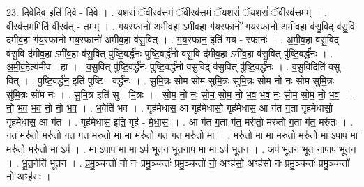 \documentclass[17pt]{extarticle}
\begin{document}
23. दि॒वेदि॑व॒ इति॑ दि॒वे - दि॒वे॒ । . य॒शसं॑ ॅवी॒रव॑त्तमं ॅवी॒रव॑त्तमं ॅय॒शसं॑ ॅय॒शसं॑ ॅवी॒रव॑त्तमम् । . वी॒रव॑त्तम॒मिति॑ वी॒रव॑त् - त॒म॒म् । . ग॒य॒स्फानो॑ अमीव॒हा ऽमी॑व॒हा ग॑य॒स्फानो॑ गय॒स्फानो॑ अमीव॒हा व॑सु॒विद् व॑सु॒वि द॑मीव॒हा ग॑य॒स्फानो॑ गय॒स्फानो॑ अमीव॒हा व॑सु॒वित् । . ग॒य॒स्फान॒ इति॑ गय - स्फानः॑ । . अ॒मी॒व॒हा व॑सु॒विद् व॑सु॒वि द॑मीव॒हा ऽमी॑व॒हा व॑सु॒वित् पु॑ष्टि॒वर्द्ध॑नः पुष्टि॒वर्द्ध॑नो वसु॒वि द॑मीव॒हा ऽमी॑व॒हा व॑सु॒वित् पु॑ष्टि॒वर्द्ध॑नः । . अ॒मी॒व॒हेत्य॑मीव - हा । . व॒सु॒वित् पु॑ष्टि॒वर्द्ध॑नः पुष्टि॒वर्द्ध॑नो वसु॒विद् व॑सु॒वित् पु॑ष्टि॒वर्द्ध॑नः । . व॒सु॒विदिति॑ वसु - वित् । . पु॒ष्टि॒वर्द्ध॑न॒ इति॑ पुष्टि - वर्द्ध॑नः । . सु॒मि॒त्रः सो॑म सोम सुमि॒त्रः सु॑मि॒त्रः सो॑म नो नः सोम सुमि॒त्रः सु॑मि॒त्रः सो॑म नः । . सु॒मि॒त्र इति॑ सु - मि॒त्रः । . सो॒म॒ नो॒ नः॒ सो॒म॒ सो॒म॒ नो॒ भ॒व॒ भ॒व॒ नः॒ सो॒म॒ सो॒म॒ नो॒ भ॒व॒ । . नो॒ भ॒व॒ भ॒व॒ नो॒ नो॒ भ॒व॒ । . भ॒वेति॑ भव । . गृह॑मेधास॒ आ गृह॑मेधासो॒ गृह॑मेधास॒ आ ग॑त ग॒ता गृह॑मेधासो॒ गृह॑मेधास॒ आ ग॑त । . गृह॑मेधास॒ इति॒ गृह॑ - मे॒धा॒सः॒ । . आ ग॑त ग॒ता ग॑त॒ मरु॑तो॒ मरु॑तो ग॒ता ग॑त॒ मरु॑तः । . ग॒त॒ मरु॑तो॒ मरु॑तो गत गत॒ मरु॑तो॒ मा मा मरु॑तो गत गत॒ मरु॑तो॒ मा । . मरु॑तो॒ मा मा मरु॑तो॒ मरु॑तो॒ मा ऽपाप॒ मा मरु॑तो॒ मरु॑तो॒ मा ऽप॑ । . मा ऽपाप॒ मा मा ऽप॑ भूतन भूत॒नाप॒ मा मा ऽप॑ भूतन । . अप॑ भूतन भूत॒ नापाप॑ भूतन । . भू॒त॒नेति॑ भूतन । . प्र॒मु॒ञ्चन्तो॑ नो नः प्रमु॒ञ्चन्तः॑ प्रमु॒ञ्चन्तो॑ नो॒ अꣳह॑सो॒ अꣳह॑सो नः प्रमु॒ञ्चन्तः॑ प्रमु॒ञ्चन्तो॑ नो॒ अꣳह॑सः । \newline
\end{document}
